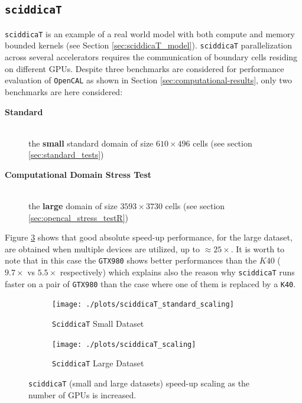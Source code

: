 \subsection{\texttt{sciddicaT}}
\texttt{sciddicaT} is an example of a real world model with both compute and memory bounded kernels (see Section \ref{sec:sciddicaT_model}). \texttt{sciddicaT} parallelization across several accelerators requires the communication of boundary cells residing on different GPUs.
Despite three benchmarks are considered for performance evaluation of \texttt{OpenCAL} as shown in Section \ref{sec:computational-results}, only two benchmarks are here considered: 
\begin{description}
	\item[\textbf{Standard}]\hfil \\ the \textbf{small} standard domain of size $610 \times 496$ cells (see section \ref{sec:standard_tests})
	\item[\textbf{Computational Domain Stress Test}]\hfil \\ the \textbf{large}  domain of size $3593 \times 3730$ cells (see section \ref{sec:opencal_stress_testR})
\end{description}
Figure \ref{fig:sciddica_scaling} shows that good absolute speed-up performance, for the large dataset, are obtained when multiple devices are utilized, up to $\approx 25 \times$. It is worth to note that in this case the \texttt{GTX980} shows better performances than the $K40$ ( $9.7\times$ vs $5.5 \times$ respectively) which explains also the reason why \texttt{sciddicaT} runs faster on a pair of \texttt{GTX980} than the case where one of them is replaced by a \texttt{K40}.
\begin{figure}[!htb]	
	\begin{subfigure}{1.0\textwidth}
		\caption{\texttt{SciddicaT} Small Dataset}
		\label{fig:sciddica_standard_scaling}
		\texttt{[image: ./plots/sciddicaT\_standard\_scaling]}
	\end{subfigure}
	\endminipage
	
	\begin{subfigure}{1.0\textwidth}
		\caption{\texttt{SciddicaT} Large Dataset}
		\label{fig:sciddica_stress_scaling}
		\texttt{[image: ./plots/sciddicaT\_scaling]}
	\end{subfigure}
	\endminipage\hfill
	\caption[]{\texttt{sciddicaT} (small and large datasets) speed-up scaling as the number of GPUs is increased.}
	\label{fig:sciddica_scaling}
\end{figure}
